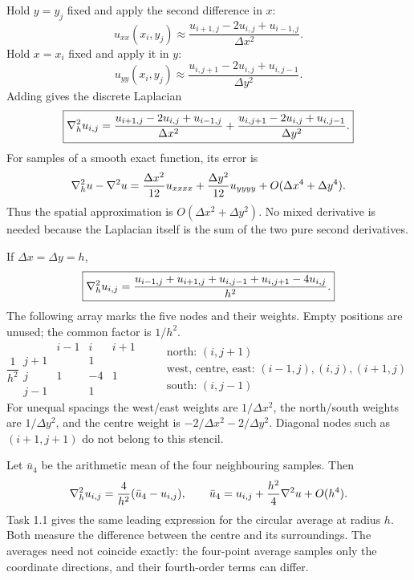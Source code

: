 Hold $y=y_j$ fixed and apply the second difference in $x$:
\[
\boxed{u_{xx}(x_i,y_j)\approx
\frac{u_{i+1,j}-2u_{i,j}+u_{i-1,j}}{\Delta x^2}.}
\]
Hold $x=x_i$ fixed and apply it in $y$:
\[
\boxed{u_{yy}(x_i,y_j)\approx
\frac{u_{i,j+1}-2u_{i,j}+u_{i,j-1}}{\Delta y^2}.}
\]
Adding gives the discrete Laplacian
\[
\boxed{\nabla^2_hu_{i,j}=
\frac{u_{i+1,j}-2u_{i,j}+u_{i-1,j}}{\Delta x^2}
+\frac{u_{i,j+1}-2u_{i,j}+u_{i,j-1}}{\Delta y^2}.}
\]
For samples of a smooth exact function, its error is
\[
\nabla^2_hu-\nabla^2 u
=\frac{\Delta x^2}{12}u_{xxxx}+\frac{\Delta y^2}{12}u_{yyyy}
+O(\Delta x^4+\Delta y^4).
\]
Thus the spatial approximation is $O(\Delta x^2+\Delta y^2)$.
No mixed derivative is needed because the Laplacian itself is the sum of the two pure second derivatives.

If $\Delta x=\Delta y=h$,
\[
\boxed{\nabla^2_hu_{i,j}=
\frac{u_{i-1,j}+u_{i+1,j}+u_{i,j-1}+u_{i,j+1}-4u_{i,j}}{h^2}.}
\]
The following array marks the five nodes and their weights. Empty positions are unused;
the common factor is $1/h^2$.
\[
\frac{1}{h^2}
\begin{array}{c|ccc}
 & i-1&i&i+1\\\hline
j+1&&1&\\
j&1&-4&1\\
j-1&&1&
\end{array}
\qquad
\begin{array}{c}
\text{north: }(i,j+1)\\
\text{west, centre, east: }(i-1,j),(i,j),(i+1,j)\\
\text{south: }(i,j-1)
\end{array}
\]
For unequal spacings the west/east weights are $1/\Delta x^2$, the north/south weights
are $1/\Delta y^2$, and the centre weight is $-2/\Delta x^2-2/\Delta y^2$.
Diagonal nodes such as $(i+1,j+1)$ do not belong to this stencil.

Let $\bar u_4$ be the arithmetic mean of the four neighbouring samples. Then
\[
\nabla^2_hu_{i,j}=\frac{4}{h^2}(\bar u_4-u_{i,j}),
\qquad
\bar u_4=u_{i,j}+\frac{h^2}{4}\nabla^2 u+O(h^4).
\]
Task 1.1 gives the same leading expression for the circular average at radius $h$.
Both measure the difference between the centre and its surroundings. The averages need not
coincide exactly: the four-point average samples only the coordinate directions, and their
fourth-order terms can differ.

